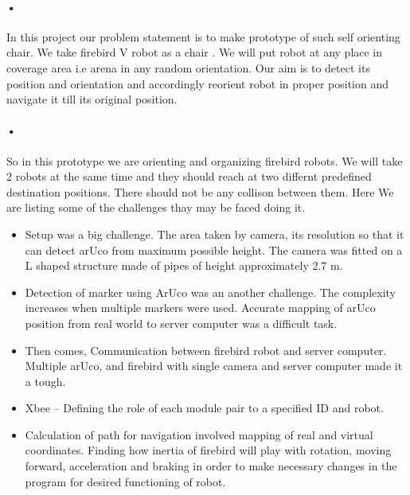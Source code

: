 \documentclass[]{exam}
\begin{document}
\paragraph{•}
In this project our problem statement is to make prototype of such self orienting chair. We take firebird V robot as a chair . We will put robot at any place in coverage area i.e arena in any random orientation. Our aim is to detect its position and orientation and accordingly reorient robot in proper position and navigate it till its original position. 
\paragraph{•}
 So in this prototype we are orienting and organizing firebird robots. We will take 2 robots at the same time and they should reach at two differnt predefined destination positions. There should not be any collison between them. Here We are listing some of the challenges thay may be faced doing it. 
 \begin{itemize}
 \item Setup was a big challenge. The area taken by camera, its resolution so that it can detect arUco from maximum possible height. The camera was fitted on a L shaped structure made of pipes of height approximately 2.7 m. 
\item Detection of marker using ArUco was an another challenge. The complexity increases when multiple markers were used. Accurate mapping of arUco position from real world to server computer was a difficult task.  
\item  Then comes, Communication between firebird robot and server computer. Multiple arUco, and firebird with single camera and server computer made it a tough.
\item Xbee – Defining the role of each module pair to a specified ID and robot. 
\item  Calculation of path for navigation involved mapping of real and virtual coordinates. Finding how inertia of firebird will play with rotation, moving forward, acceleration and braking in order to make necessary changes in the program for desired functioning of robot.
\end{itemize}  
\end{document}
